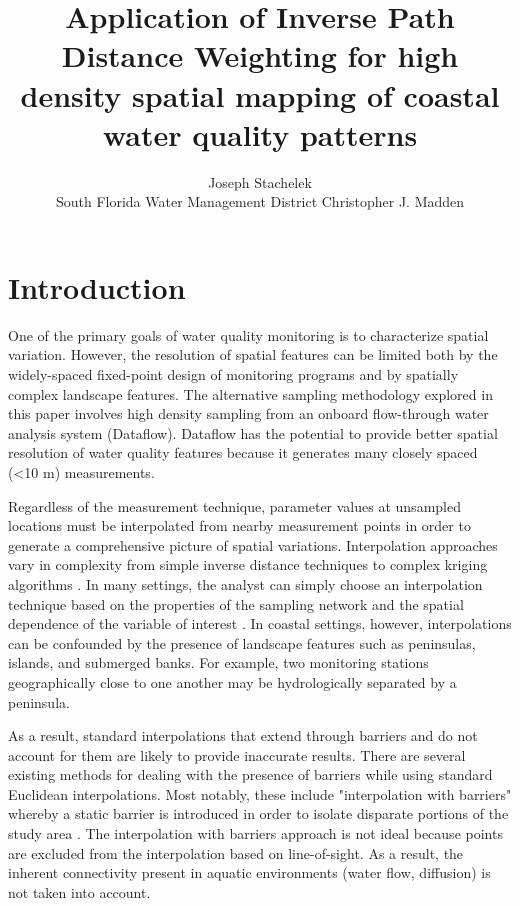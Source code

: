 \documentclass[shortnames,nofooter,noheadings]{jss}
\author{Joseph Stachelek\\   South Florida Water Management District
\And
  Christopher J. Madden}
\title{Application of Inverse Path Distance Weighting for high density spatial mapping of coastal water quality patterns}
\begin{document}

\section[Introduction]{Introduction}
\noindent One of the primary goals of water quality monitoring is to characterize spatial variation. However, the resolution of spatial features can be limited both by the widely-spaced fixed-point design of monitoring programs and by spatially complex landscape features. The alternative sampling methodology explored in this paper involves high density sampling from an onboard flow-through water analysis system (Dataflow). Dataflow \citep{madden1992instrument} has the potential to provide better spatial resolution of water quality features because it generates many closely spaced (<10 m) measurements.

  Regardless of the measurement technique, parameter values at unsampled locations must be interpolated from nearby measurement points in order to generate a comprehensive picture of spatial variations. Interpolation approaches vary in complexity from simple inverse distance techniques to complex kriging algorithms \citep{zimmerman1999experimental}. In many settings, the analyst can simply choose an interpolation technique based on the properties of the sampling network and the spatial dependence of the variable of interest \citep{isaaks1989applied}. In coastal settings, however, interpolations can be confounded by the presence of landscape features such as peninsulas, islands, and submerged banks.  For example, two monitoring stations geographically close to one another may be hydrologically separated by a peninsula. 

  As a result, standard interpolations that extend through barriers and do not account for them are likely to provide inaccurate results. There are several existing methods for dealing with the presence of barriers while using standard Euclidean interpolations. Most notably, these include "interpolation with barriers" whereby a static barrier is introduced in order to isolate disparate portions of the study area \citep{krivoruchko2004geostatistical,soderqvist2010seasonal}. The interpolation with barriers approach is not ideal because points are excluded from the interpolation based on line-of-sight. As a result, the inherent connectivity present in aquatic environments (water flow, diffusion) is not taken into account. 
\end{document}
